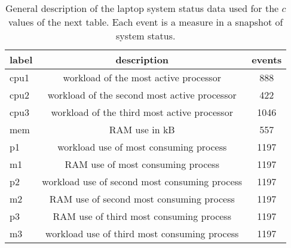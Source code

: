 \begin{table}[h!]
\begin{center}
\begin{tabular}{| l | c | c |}\hline
label & description & events \\\hline
cpu1 & workload of the most active processor & 888 \\\hline
cpu2 & workload of the second most active processor & 422 \\\hline
cpu3 & workload of the third most active processor & 1046 \\\hline
mem & RAM use in kB & 557 \\\hline
p1 & workload use of most consuming process & 1197 \\\hline
m1 & RAM use of most consuming process & 1197 \\\hline
p2 & workload use of second most consuming process & 1197 \\\hline
m2 & RAM use of second most consuming process & 1197 \\\hline
p3 & RAM use of third most consuming process & 1197 \\\hline
m3 & workload use of third most consuming process & 1197 \\\hline
\end{tabular}
\caption{General description of the laptop system status data used for the $c$ values of the next table. Each event is a measure in a snapshot of system status.}
\end{center}
\end{table}